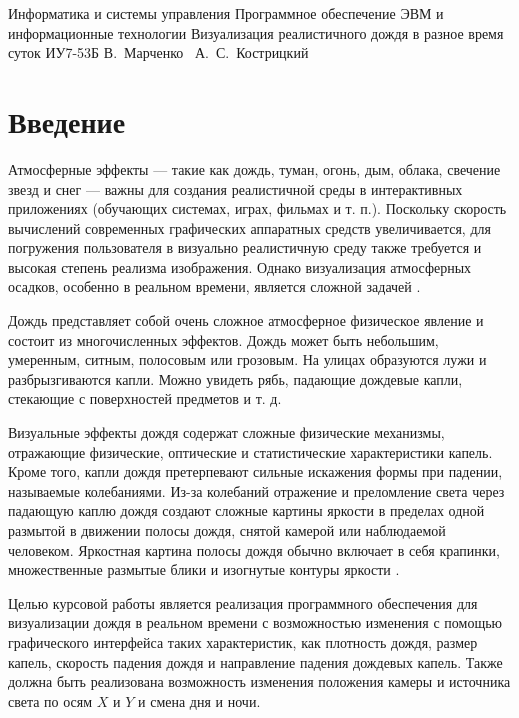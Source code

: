 



\makecourseworktitle
    {Информатика и системы управления}
    {Программное обеспечение ЭВМ и информационные технологии}
    {Визуализация реалистичного дождя в разное время суток}
    {ИУ7-53Б}
    {В.~Марченко}
    {~А.~С.~Кострицкий}
    {}
    {}
    
\tableofcontents

{\center\chapter*{Введение}}

Атмосферные эффекты --- такие как дождь, туман, огонь, дым, облака, свечение звезд и снег --- важны для создания реалистичной среды в интерактивных приложениях (обучающих системах, играх, фильмах и т. п.). 
Поскольку скорость вычислений современных графических аппаратных средств увеличивается, для погружения пользователя в визуально реалистичную среду также требуется и высокая степень реализма изображения. 
Однако визуализация атмосферных осадков, особенно в реальном времени, является сложной задачей \cite[1]{Tariq2007}.

Дождь представляет собой очень сложное атмосферное физическое явление и состоит из многочисленных эффектов. 
Дождь может быть небольшим, умеренным, ситным, полосовым или грозовым. 
На улицах образуются лужи и разбрызгиваются капли. 
Можно увидеть рябь, падающие дождевые капли, стекающие с поверхностей предметов и т. д. \cite{Hao2008}

Визуальные эффекты дождя содержат сложные физические механизмы, отражающие физические, оптические и статистические характеристики капель. 
Кроме того, капли дождя претерпевают сильные искажения формы при падении, называемые колебаниями. 
Из-за колебаний отражение и преломление света через падающую каплю дождя создают сложные картины яркости в пределах одной размытой в движении полосы дождя, снятой камерой или наблюдаемой человеком. 
Яркостная картина полосы дождя обычно включает в себя крапинки, множественные размытые блики и изогнутые контуры яркости \cite{Garg2006}.

Целью курсовой работы является реализация программного обеспечения для визуализации дождя в реальном времени с возможностью изменения с помощью графического интерфейса таких характеристик, как плотность дождя, размер капель, скорость падения дождя и направление падения дождевых капель. 
Также должна быть реализована возможность изменения положения камеры и источника света по осям $X$ и $Y$ и смена дня и ночи.

